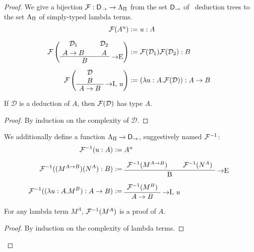 \begin{proof}
We give a bijection $\mathcal{F}: \mathsf{D}_\to \to \Lambda_\Pi$ from the set $\mathsf{D}_\to$
of \implnpi\ deduction trees to the set $\Lambda_\Pi$ of simply-typed lambda terms.
\begin{alignat*}{2}
\chmap(A^u) &:= u: A \\[6pt]
\chmap\left(
  \AxiomC{$\mathcal{D}_1$}
  \noLine
  \UnaryInfC{$A \to B$}
  \AxiomC{$\mathcal{D}_2$}
  \noLine
  \UnaryInfC{$A$}
  \RightLabel{$\to$E}
  \BinaryInfC{$B$}
  \DisplayProof
\right) &:= \chmap(\mathcal{D}_1) \chmap(\mathcal{D}_2): B \\[6pt]
\chmap\left(
  \AxiomC{$\mathcal{D}$}
  \noLine
  \UnaryInfC{$B$}
  \RightLabel{$\to$I, $u$}
  \UnaryInfC{$A \to B$}
  \DisplayProof
\right) &:= (\lambda u: A.\chmap(\mathcal{D})): A \to B
\end{alignat*}

\begin{proposition}
If $\mathcal{D}$ is a deduction of $A$, then $\mathcal{F}(\mathcal{D})$ has type $A$.
\end{proposition}

\begin{proof}
By induction on the complexity of $\mathcal{D}$.
\end{proof}

\noindent We additionally define a function $\Lambda_\Pi \to \mathsf{D}_\to$,
suggestively named $\mathcal{F}^{-1}$:
\begin{alignat*}{2}
\chmapanta(u: A) & := A^u \\[6pt]
\chmapanta((M^{A \to B})(N^A): B) &:=
  \AxiomC{$\chmapanta(M^{A \to B})$}
  \AxiomC{$\chmapanta(N^A)$}
  \RightLabel{$\to$E}
  \BinaryInfC{B}
  \DisplayProof \\[6pt]
\chmapanta((\lambda u:A.M^B):A \to B) &:=
  \AxiomC{$\chmapanta(M^B)$}
  \RightLabel{$\to$I, $u$}
  \UnaryInfC{$A \to B$}
  \DisplayProof
\end{alignat*}

\begin{proposition}
For any lambda term $M^A$, $\mathcal{F}^{-1}(M^A)$ is a proof of $A$.
\end{proposition}

\begin{proof}
By induction on the complexity of lambda terms.
\end{proof}


\end{proof}
